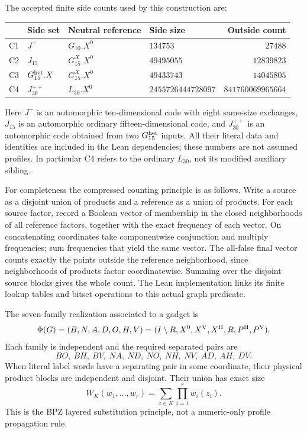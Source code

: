 \documentclass[11pt,a4paper]{article}
\theoremstyle{definition}
\theoremstyle{remark}
\newcommand{\PhiG}{\Phi}
\begin{document}
The accepted finite side counts used by this construction are:
\begin{center}\small
\begin{tabular}{@{}llllr@{}}
\toprule
 & Side set & Neutral reference & Side size & Outside count\\
\midrule
C1 & $J^+$ & $G_{10}.X^0$ & $134753$ & $27488$\\
C2 & $J_{15}$ & $G_{15}^{X}.X^0$ & $49495055$ & $12839823$\\
C3 & $G_{15}^{\rm het}.X$ & $G_{15}^{X}.X^0$ & $49433743$ & $14045805$\\
C4 & $J_{30}^{++}$ & $L_{30}.X^0$ & $2455726444728097$ & $841760069965664$\\
\bottomrule
\end{tabular}
\end{center}
Here $J^+$ is an automorphic ten-dimensional code with eight same-size
exchanges, $J_{15}$ is an automorphic ordinary fifteen-dimensional
code, and $J_{30}^{++}$ is an automorphic code obtained from two
$G_{15}^{\rm het}$ inputs. All their literal data and identities are
included in the Lean dependencies; these numbers are not assumed
profiles. In particular C4 refers to the ordinary $L_{30}$, not its
modified auxiliary sibling.

For completeness the compressed counting principle is as follows.
Write a source as a disjoint union of products and a reference as a
union of products. For each source factor, record a Boolean vector
of membership in the closed neighborhoods of all reference factors,
together with the exact frequency of each vector. On concatenating
coordinates take componentwise conjunction and multiply frequencies;
sum frequencies that yield the same vector. The all-false final vector
counts exactly the points outside the reference neighborhood, since
neighborhoods of products factor coordinatewise. Summing over the
disjoint source blocks gives the whole count. The Lean implementation
links its finite lookup tables and bitset operations to this actual
graph predicate.

The seven-family realization associated to a gadget is
\[
 \PhiG(G)=(B,N,A,D,O,H,V)
 =(I\setminus R,X^0,X^{\rm V},X^{\rm H},R,P^{\rm H},P^{\rm V}).
\]
Each family is independent and the required separated pairs are
\begin{equation}\label{eq:letters}
 BO,\ BH,\ BV,\ NA,\ ND,\ NO,\ NH,\ NV,\ AD,\ AH,\ DV.
\end{equation}
When literal label words have a separating pair in some coordinate,
their physical product blocks are independent and disjoint. Their
union has exact size
\begin{equation}\label{eq:weighted}
 W_K(w_1,\ldots,w_r)=\sum_{z\in K}\prod_{i=1}^r w_i(z_i).
\end{equation}
This is the BPZ layered substitution principle, not a numeric-only
profile propagation rule.
\end{document}

